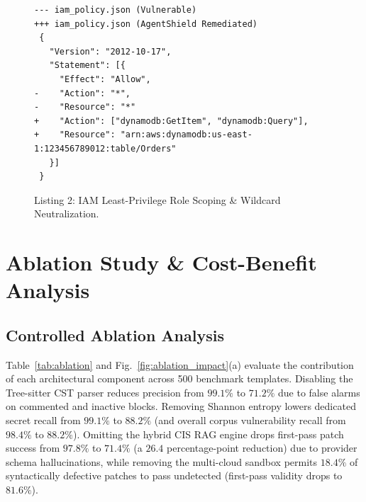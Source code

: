\documentclass[runningheads]{llncs}
\begin{document}
\begin{figure}[t]
\centering
\begin{minipage}{0.95\textwidth}
\begin{scriptsize}
\begin{verbatim}
--- iam_policy.json (Vulnerable)
+++ iam_policy.json (AgentShield Remediated)
 {
   "Version": "2012-10-17",
   "Statement": [{
     "Effect": "Allow",
-    "Action": "*",
-    "Resource": "*"
+    "Action": ["dynamodb:GetItem", "dynamodb:Query"],
+    "Resource": "arn:aws:dynamodb:us-east-1:123456789012:table/Orders"
   }]
 }
\end{verbatim}
\end{scriptsize}
\end{minipage}
\caption{Listing 2: IAM Least-Privilege Role Scoping \& Wildcard Neutralization.}
\label{lst:iam}
\end{figure}


\section{Ablation Study \& Cost-Benefit Analysis}

\subsection{Controlled Ablation Analysis}
Table~\ref{tab:ablation} and Fig.~\ref{fig:ablation_impact}(a) evaluate the contribution of each architectural component across 500 benchmark templates. Disabling the Tree-sitter CST parser reduces precision from $99.1\%$ to $71.2\%$ due to false alarms on commented and inactive blocks. Removing Shannon entropy lowers dedicated secret recall from $99.1\%$ to $88.2\%$ (and overall corpus vulnerability recall from $98.4\%$ to $88.2\%$). Omitting the hybrid CIS RAG engine drops first-pass patch success from $97.8\%$ to $71.4\%$ (a $26.4$ percentage-point reduction) due to provider schema hallucinations, while removing the multi-cloud sandbox permits $18.4\%$ of syntactically defective patches to pass undetected (first-pass validity drops to $81.6\%$).
\end{document}
